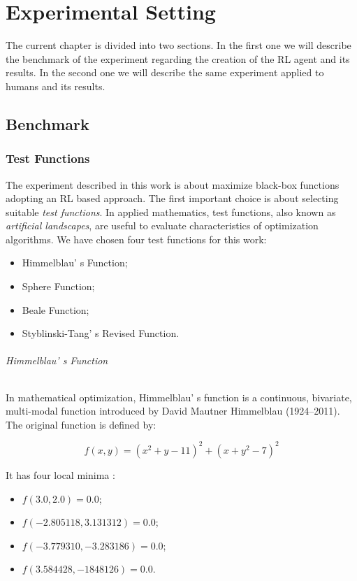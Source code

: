 \chapter{Experimental Setting}

The current chapter is divided into two sections. In the first one we will describe the benchmark of the experiment regarding the creation of the RL agent and its results. In the second one we will describe the same experiment applied to humans and its results.

\section{Benchmark}

\subsection{Test Functions}

The experiment described in this work is about maximize black-box functions adopting an RL based approach. The first important choice is about selecting suitable \textit{test functions}. In applied mathematics, test functions, also known as \textit{artificial landscapes}, are useful to evaluate characteristics of optimization algorithms. We have chosen four test functions for this work:

\begin{itemize}
	\item Himmelblau' s Function;
	\item Sphere Function;
	\item Beale Function;
	\item Styblinski-Tang' s Revised Function.	
\end{itemize}

\subparagraph{Himmelblau' s Function} In mathematical optimization, Himmelblau' s function is a continuous, bivariate, multi-modal function introduced by David Mautner Himmelblau (1924–2011). The original function is defined by: 

\begin{equation}
	f(x, y) = (x^2 + y -11)^2 + (x + y^2 - 7)^2
\end{equation}

It has four local minima :

\begin{itemize}
	\item $f(3.0, 2.0) = 0.0$;
	\item $f(-2.805118, 3.131312) = 0.0$;
	\item $f(-3.779310, -3.283186) = 0.0$;
	\item $f(3.584428, -1848126) = 0.0$.
\end{itemize}
	

